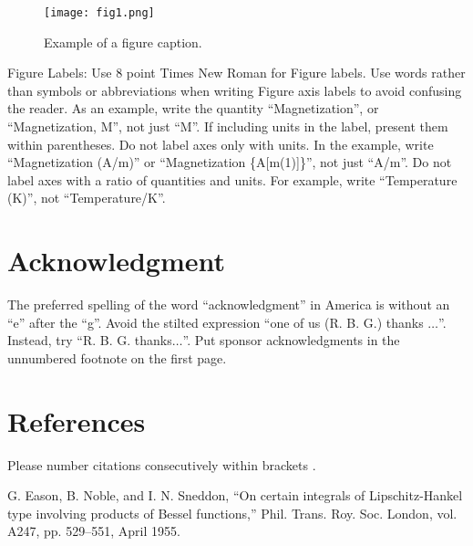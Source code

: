 \documentclass[conference]{IEEEtran}
\begin{document}
\begin{figure}[htbp]
\centerline{\texttt{[image: fig1.png]}}
\caption{Example of a figure caption.}
\label{fig}
\end{figure}

Figure Labels: Use 8 point Times New Roman for Figure labels. Use words 
rather than symbols or abbreviations when writing Figure axis labels to 
avoid confusing the reader. As an example, write the quantity 
``Magnetization'', or ``Magnetization, M'', not just ``M''. If including 
units in the label, present them within parentheses. Do not label axes only 
with units. In the example, write ``Magnetization (A/m)'' or ``Magnetization 
\{A[m(1)]\}'', not just ``A/m''. Do not label axes with a ratio of 
quantities and units. For example, write ``Temperature (K)'', not 
``Temperature/K''.

\section*{Acknowledgment}

The preferred spelling of the word ``acknowledgment'' in America is without 
an ``e'' after the ``g''. Avoid the stilted expression ``one of us (R. B. 
G.) thanks $\ldots$''. Instead, try ``R. B. G. thanks$\ldots$''. Put sponsor 
acknowledgments in the unnumbered footnote on the first page.

\section*{References}
Please number citations consecutively within brackets \cite{b1}.

\begin{thebibliography}{00}
 G. Eason, B. Noble, and I. N. Sneddon, ``On certain integrals of Lipschitz-Hankel type involving products of Bessel functions,'' Phil. Trans. Roy. Soc. London, vol. A247, pp. 529--551, April 1955.
\end{thebibliography}
\end{document}
